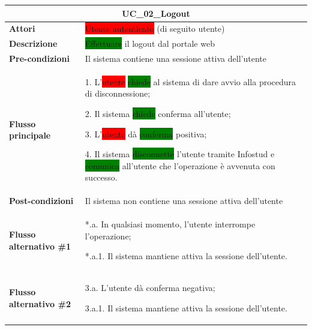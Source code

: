 \documentclass[11pt]{article}
\begin{document}
\begin{table}[H]
\centering
\begin{tabularx}{1\textwidth}{|l|X|}
\hline
\multicolumn{2}{|c|}{\textbf{UC\_02\_Logout}}\\
\hline \textbf{Attori} & \colorbox{red}{Utente autenticato} (di seguito utente)\\
\hline \textbf{Descrizione} & \colorbox{green}{Effettuare} il logout dal portale web\\
\hline \textbf{Pre-condizioni} & Il sistema contiene una sessione attiva dell'utente\\
\hline \textbf{Flusso principale} & 
1. L'\colorbox{red}{utente} \colorbox{green}{chiede} al sistema di dare avvio alla procedura di disconnessione;

2. Il sistema \colorbox{green}{chiede} conferma all'utente;

3. L'\colorbox{red}{utente} dà \colorbox{green}{conferma} positiva;

4. Il sistema \colorbox{green}{disconnette} l'utente tramite Infostud e \colorbox{green}{comunica} all'utente che l'operazione è
avvenuta con successo.
\\
\hline \textbf{Post-condizioni} & Il sistema non contiene una sessione attiva dell'utente\\
\hline \textbf{Flusso alternativo \#1} & 
*.a. In qualsiasi momento, l'utente interrompe l'operazione;

*.a.1. Il sistema mantiene attiva la sessione dell'utente.
\\
\hline \textbf{Flusso alternativo \#2} & 
3.a. L'utente dà conferma negativa;

3.a.1. Il sistema mantiene attiva la sessione dell'utente.
\\
\hline
\end{tabularx}
\end{table}
\end{document}
